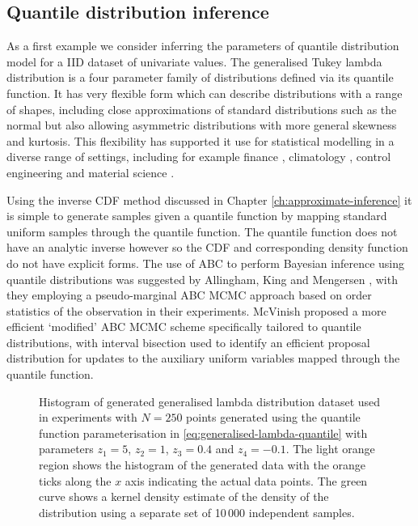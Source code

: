 \subsection{Quantile distribution inference}

As a first example we consider inferring the parameters of quantile distribution model for a \acs{IID} dataset of univariate values. The generalised Tukey lambda distribution \citep{ramberg1974approximate,freimer1988study} is a four parameter family of distributions defined via its quantile function. It has very flexible form which can describe distributions with a range of shapes, including close approximations of standard distributions such as the normal but also allowing asymmetric distributions with more general skewness and kurtosis. This flexibility has supported it use for statistical modelling in a diverse range of settings, including for example finance \citep{corrado2001option}, climatology \citep{ozturk1982study}, control engineering \citep{pal2004evaluation} and material science \citep{bigerelle2006application}.

Using the inverse \ac{CDF} method discussed in Chapter \ref{ch:approximate-inference} it is simple to generate samples given a quantile function by mapping standard uniform samples through the quantile function. The quantile function does not have an analytic inverse however so the \ac{CDF} and corresponding density function do not have explicit forms. The use of \ac{ABC} to perform Bayesian inference using quantile distributions was suggested by Allingham, King and Mengersen  \citep{allingham2009bayesian}, with they employing a pseudo-marginal \ac{ABC} \ac{MCMC} approach based on order statistics of the observation in their experiments. McVinish \citep{mcvinish2012improving} proposed a more efficient `modified' \ac{ABC} \ac{MCMC} scheme specifically tailored to quantile distributions, with interval bisection used to identify an efficient proposal distribution for updates to the auxiliary uniform variables mapped through the quantile function.

\begin{figure}[t]
\centering
{}
\caption[Generated generalised lambda distribution data.]{Histogram of generated generalised lambda distribution dataset used in experiments with $N=250$ points generated using the quantile function parameterisation in \eqref{eq:generalised-lambda-quantile} with parameters $z_1 = 5$, $z_2 = 1$, $z_3 = 0.4$ and $z_4 = -0.1$. The light orange region shows the histogram of the generated data with the orange ticks along the $x$ axis indicating the actual data points. The green curve shows a kernel density estimate of the density of the distribution using a separate set of 10\,000 independent samples.}
\label{fig:generalised-lambda-generated-data}
\end{figure}

